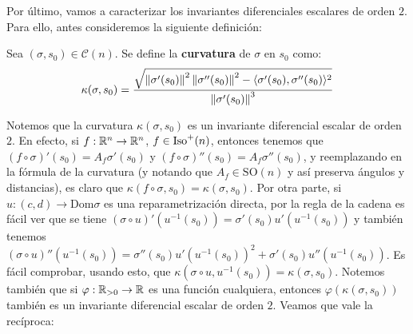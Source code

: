 Por último, vamos a caracterizar los invariantes diferenciales escalares de orden $2$. Para ello, antes consideremos la siguiente definición:

\begin{defn}
Sea $(\sigma,s_0)\in\mathscr{C}(n)$. Se define la \textbf{curvatura} de $\sigma$ en $s_0$ como: $$\kappa(\sigma,s_0)=\dfrac{\sqrt{\left\| \sigma'(s_0) \right\|^2\left\| \sigma''(s_0) \right\|^2 - \langle\sigma'(s_0),\sigma''(s_0)\rangle^2}}{\left\| \sigma'(s_0) \right\|^3}$$
\end{defn}

Notemos que la curvatura $\kappa(\sigma,s_0)$ es un invariante diferencial escalar de orden $2$. En efecto, si $f:\mathbb{R}^n\to\mathbb{R}^n$, $f\in\operatorname{Iso}^+(n)$, entonces tenemos que $(f\circ\sigma)'(s_0)=A_f\sigma'(s_0)$ y $(f\circ\sigma)''(s_0)=A_f\sigma''(s_0)$, y reemplazando en la fórmula de la curvatura (y notando que $A_f\in\mathrm{SO}(n)$ y así preserva ángulos y distancias), es claro que $\kappa(f\circ\sigma,s_0)=\kappa(\sigma,s_0)$. Por otra parte, si $u:(c,d)\to\mathrm{Dom}\sigma$ es una reparametrización directa, por la regla de la cadena es fácil ver que se tiene $(\sigma\circ u)'(u^{-1}(s_0)) = \sigma'(s_0)u'(u^{-1}(s_0))$ y también tenemos $(\sigma\circ u)''(u^{-1}(s_0)) = \sigma''(s_0) u'(u^{-1}(s_0))^2 + \sigma'(s_0)u''(u^{-1}(s_0))$. Es fácil comprobar, usando esto, que $\kappa(\sigma\circ u,u^{-1}(s_0)) = \kappa(\sigma,s_0)$. Notemos también que si $\varphi:\mathbb{R}_{>0}\to\mathbb{R}$ es una función cualquiera, entonces $\varphi(\kappa(\sigma,s_0))$ también es un invariante diferencial escalar de orden $2$. Veamos que vale la recíproca:

